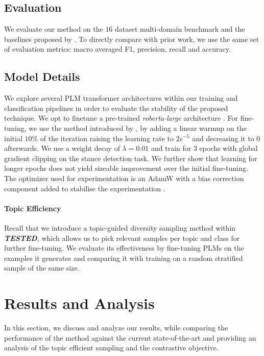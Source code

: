 \documentclass[11pt]{article}
\begin{document}
\subsection{Evaluation}
We evaluate our method on the $16$ dataset multi-domain benchmark and the baselines proposed by \citet{hardalov2021cross}. To directly compare with prior work, we use the same set of evaluation metrics: macro averaged F1, precision, recall and accuracy.

\subsection{Model Details}

We explore several PLM transformer architectures within our training and classification pipelines in order to evaluate the stability of the proposed technique. We opt to finetune a pre-trained \textit{roberta-large} architecture \cite{liu2019roberta, conneau2019unsupervised}. For fine-tuning, we use the method introduced by \citet{mosbach2020stability}, by adding a linear warmup on the initial $10\%$ of the iteration raising the learning rate to $2e^{-5}$ and decreasing it to $0$ afterwards. We use a weight decay of $\lambda = 0.01$ and train for $3$ epochs with global gradient clipping on the stance detection task. We further show that learning for longer epochs does not yield sizeable improvement over the initial fine-tuning. The optimizer used for experimentation is an AdamW \citep{loshchilov2017decoupled} with a bias correction component added to stabilise the experimentation \citep{mosbach2020stability}. 

\paragraph{Topic Efficiency}

Recall that we introduce a topic-guided diversity sampling method within \textbf{\textit{TESTED}}, which allows us to pick relevant samples per topic and class for further fine-tuning. We evaluate its effectiveness by fine-tuning PLMs on the examples it generates and comparing it with training on a random stratified sample of the same size. 


\section{Results and Analysis}

In this section, we discuss and analyze our results, while comparing the performance of the method against the current state-of-the-art \citep{hardalov2021cross} and providing an analysis of the topic efficient sampling and the contrastive objective.
\end{document}

